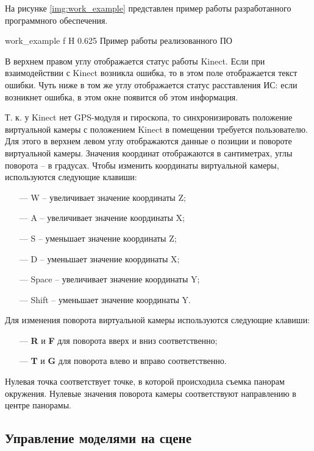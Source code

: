 На рисунке \ref{img:work_example} представлен пример работы разработанного программного обеспечения.

{work_example}
{f}
{H}
{0.625\textwidth}
{Пример работы реализованного ПО}

В верхнем правом углу отображается статус работы Kinect. Если при взаимодействии с Kinect возникла ошибка, то в этом поле отображается текст ошибки. Чуть ниже в том же углу отображается статус расставления ИС: если возникнет ошибка, в этом окне появится об этом информация.

Т. к. у Kinect нет GPS-модуля и гироскопа, то синхронизировать положение виртуальной камеры с положением Kinect в помещении требуется пользователю. Для этого в верхнем левом углу отображаются данные о позиции и повороте виртуальной камеры. Значения координат отображаются в сантиметрах, углы поворота -- в градусах. Чтобы изменить координаты виртуальной камеры, используются следующие клавиши:

\begin{itemize}
	\item[---] W -- увеличивает значение координаты Z;
	\item[---] A -- увеличивает значение координаты X;
	\item[---] S -- уменьшает значение координаты Z;
	\item[---] D -- уменьшает значение координаты X;
	\item[---] Space -- увеличивает значение координаты Y;
	\item[---] Shift -- уменьшает значение координаты Y.
\end{itemize}

Для изменения поворота виртуальной камеры используются следующие клавиши:

\begin{itemize}
	\item[---] \textbf{R} и \textbf{F} для поворота вверх и вниз соответственно;
	\item[---] \textbf{T} и \textbf{G} для поворота влево и вправо соответственно.
\end{itemize}

Нулевая точка соответствует точке, в которой происходила съемка панорам окружения. Нулевые значения поворота камеры соответствуют направлению в центре панорамы.

\subsection{Управление моделями на сцене}

